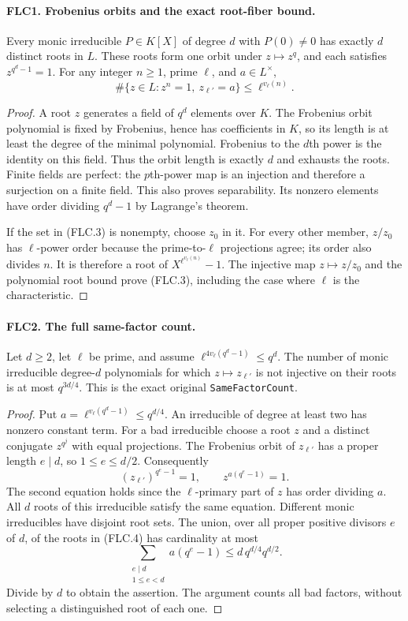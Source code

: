 \paragraph{FLC1. Frobenius orbits and the exact root-fiber bound.}
\label{claim:FLC1}
Every monic irreducible $P\in K[X]$ of degree $d$ with $P(0)\ne0$
has exactly $d$ distinct roots in $L$.  These roots form one orbit
under $z\mapsto z^q$, and each satisfies $z^{q^d-1}=1$.
For any integer $n\ge1$, prime $\ell$, and $a\in L^\times$,
\[
 \#\{z\in L:z^n=1,\ z_{\ell'}=a\}
                      \le\ell^{v_\ell(n)}.
 \tag{FLC.3}
\]
\begin{proof}
A root $z$ generates a field of $q^d$ elements over $K$.
The Frobenius orbit polynomial is fixed by Frobenius, hence has
coefficients in $K$, so its length is at least the degree of the
minimal polynomial.  Frobenius to the $d$th power is the identity
on this field.  Thus the orbit length is exactly $d$ and exhausts
the roots.  Finite fields are perfect: the $p$th-power map is an
injection and therefore a surjection on a finite field.  This also
proves separability.  Its nonzero elements have order dividing
$q^d-1$ by Lagrange's theorem.

If the set in (FLC.3) is nonempty, choose $z_0$ in it.
For every other member, $z/z_0$ has $\ell$-power order because the
prime-to-$\ell$ projections agree; its order also divides $n$.
It is therefore a root of $X^{\ell^{v_\ell(n)}}-1$.
The injective map $z\mapsto z/z_0$ and the polynomial root bound
prove (FLC.3), including the case where $\ell$ is the characteristic.
\end{proof}

\paragraph{FLC2. The full same-factor count.}
\label{claim:FLC2}
Let $d\ge2$, let $\ell$ be prime, and assume
$\ell^{4v_\ell(q^d-1)}\le q^d$.
The number of monic irreducible degree-$d$ polynomials for which
$z\mapsto z_{\ell'}$ is not injective on their roots is at most
$q^{3d/4}$.  This is the exact original \texttt{SameFactorCount}.
\begin{proof}
Put $a=\ell^{v_\ell(q^d-1)}\le q^{d/4}$.
An irreducible of degree at least two has nonzero constant term.
For a bad irreducible choose a root $z$ and a distinct conjugate
$z^{q^j}$ with equal projections.  The Frobenius orbit of
$z_{\ell'}$ has a proper length $e\mid d$, so $1\le e\le d/2$.
Consequently
\[
 (z_{\ell'})^{q^e-1}=1,\qquad z^{a(q^e-1)}=1.
 \tag{FLC.4}
\]
The second equation holds since the $\ell$-primary part of $z$
has order dividing $a$.  All $d$ roots of this irreducible
satisfy the same equation.  Different monic irreducibles have
disjoint root sets.  The union, over all proper positive divisors
$e$ of $d$, of the roots in (FLC.4) has cardinality at most
\[
 \sum_{\substack{e\mid d\\1\le e<d}} a(q^e-1)
                   \le d\,q^{d/4}q^{d/2}.
\]
Divide by $d$ to obtain the assertion.  The argument counts all
bad factors, without selecting a distinguished root of each one.
\end{proof}


